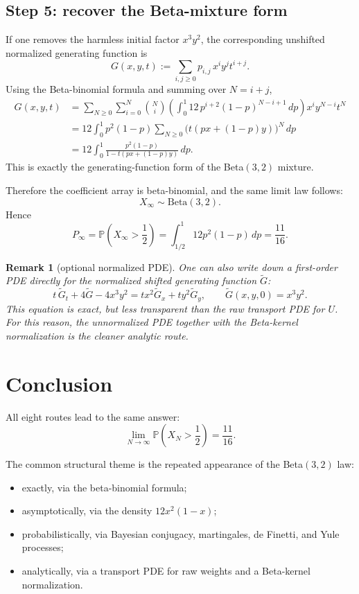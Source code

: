\documentclass[12pt]{article}
\newtheorem{remark}{Remark}
\begin{document}
\subsection*{Step 5: recover the Beta-mixture form}
If one removes the harmless initial factor $x^3y^2$, the corresponding unshifted normalized generating function is
\[
G(x,y,t):=\sum_{i,j\ge 0} p_{i,j}\,x^i y^j t^{i+j}.
\]
Using the Beta-binomial formula and summing over $N=i+j$,
\begin{align*}
G(x,y,t)
&=
\sum_{N\ge 0}\sum_{i=0}^N
\binom{N}{i}
\left(\int_0^1 12\,p^{i+2}(1-p)^{N-i+1}\,dp\right)
x^i y^{N-i} t^N \\
&=
12\int_0^1 p^2(1-p)
\sum_{N\ge 0}\bigl(t(px+(1-p)y)\bigr)^N\,dp \\
&=
12\int_0^1 \frac{p^2(1-p)}{1-t(px+(1-p)y)}\,dp.
\end{align*}
This is exactly the generating-function form of the Beta$(3,2)$ mixture.

Therefore the coefficient array is beta-binomial, and the same limit law follows:
\[
X_\infty\sim \mathrm{Beta}(3,2).
\]
Hence
\[
P_\infty
=
\mathbb{P}\!\left(X_\infty>\frac12\right)
=
\int_{1/2}^1 12p^2(1-p)\,dp
=
\frac{11}{16}.
\]

\begin{remark}[optional normalized PDE]
One can also write down a first-order PDE directly for the normalized shifted generating function $\widetilde G$:
\[
t\,\widetilde G_t+4\widetilde G-4x^3y^2
=
t x^2 \widetilde G_x + t y^2 \widetilde G_y,
\qquad
\widetilde G(x,y,0)=x^3y^2.
\]
This equation is exact, but less transparent than the raw transport PDE for $U$. For this reason, the unnormalized PDE together with the Beta-kernel normalization is the cleaner analytic route.
\end{remark}

\section{Conclusion}

All eight routes lead to the same answer:
\[
\boxed{
\lim_{N\to\infty}\mathbb{P}\!\left(X_N>\frac12\right)=\frac{11}{16}
}.
\]

The common structural theme is the repeated appearance of the Beta$(3,2)$ law:
\begin{itemize}
    \item exactly, via the beta-binomial formula;
    \item asymptotically, via the density $12x^2(1-x)$;
    \item probabilistically, via Bayesian conjugacy, martingales, de Finetti, and Yule processes;
    \item analytically, via a transport PDE for raw weights and a Beta-kernel normalization.
\end{itemize}
\end{document}
